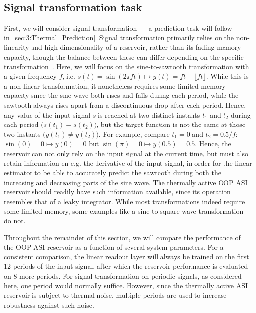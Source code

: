 \subsection{Signal transformation task}
First, we will consider signal transformation --- a prediction task will follow in~\cref{sec:3:Thermal_Prediction}.
Signal transformation primarily relies on the non-linearity and high dimensionality of a reservoir, rather than its fading memory capacity, though the balance between these can differ depending on the specific transformation~\cite{FewMoleculeReservoir,gartside2022reconfigurable,TaskAdaptivePRC}.
Here, we will focus on the sine-to-sawtooth transformation with a given frequency $f$, i.e. $s(t) = \sin(2 \pi f t) \mapsto y(t) = ft - \lfloor ft \rfloor$.
While this is a non-linear transformation, it nonetheless requires some limited memory capacity since the sine wave both rises and falls during each period, while the sawtooth always rises apart from a discontinuous drop after each period.
Hence, any value of the input signal $s$ is reached at two distinct instants $t_1$ and $t_2$ during each period $\big(s(t_1) = s(t_2)\big)$, but the target function is not the same at those two instants $\big(y(t_1) \neq y(t_2)\big)$. %
For example, compare $t_1 = 0$ and $t_2 = 0.5/f$: $\sin(0) = 0 \mapsto y(0) = 0$ but $\sin(\pi) = 0 \mapsto y(0.5) = 0.5$.
Hence, the reservoir can not only rely on the input signal at the current time, but must also retain information on e.g. the derivative of the input signal, in order for the linear estimator to be able to accurately predict the sawtooth during both the increasing and decreasing parts of the sine wave.
The thermally active OOP ASI reservoir should readily have such information available, since its operation resembles that of a leaky integrator.
While most transformations indeed require some limited memory, some examples like a sine-to-square wave transformation do not. \par
Throughout the remainder of this section, we will compare the performance of the OOP ASI reservoir as a function of several system parameters.
For a consistent comparison, the linear readout layer will always be trained on the first 12 periods of the input signal, after which the reservoir performance is evaluated on 8 more periods.
For signal transformation on periodic signals, as considered here, one period would normally suffice.
However, since the thermally active ASI reservoir is subject to thermal noise, multiple periods are used to increase robustness against such noise.

